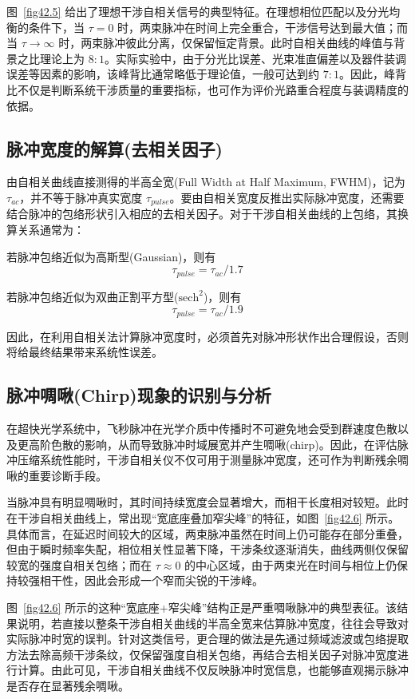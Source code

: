 图~\ref{fig42.5} 给出了理想干涉自相关信号的典型特征。在理想相位匹配以及分光均衡的条件下，当 $\tau=0$ 时，两束脉冲在时间上完全重合，干涉信号达到最大值；而当 $\tau \rightarrow \infty$ 时，两束脉冲彼此分离，仅保留恒定背景。此时自相关曲线的峰值与背景之比理论上为 $8:1$。实际实验中，由于分光比误差、光束准直偏差以及器件装调误差等因素的影响，该峰背比通常略低于理论值，一般可达到约 $7:1$。因此，峰背比不仅是判断系统干涉质量的重要指标，也可作为评价光路重合程度与装调精度的依据。

\subsection{脉冲宽度的解算(去相关因子)}\label{6.1.2}

由自相关曲线直接测得的半高全宽(Full Width at Half Maximum, FWHM)，记为 $\tau_{ac}$，并不等于脉冲真实宽度 $\tau_{pulse}$。要由自相关宽度反推出实际脉冲宽度，还需要结合脉冲的包络形状引入相应的去相关因子。对于干涉自相关曲线的上包络，其换算关系通常为：

若脉冲包络近似为高斯型(Gaussian)，则有
\[
\tau_{pulse}=\tau_{ac}/1.7
\]

若脉冲包络近似为双曲正割平方型($\mathrm{sech}^2$)，则有
\[
\tau_{pulse}=\tau_{ac}/1.9
\]

因此，在利用自相关法计算脉冲宽度时，必须首先对脉冲形状作出合理假设，否则将给最终结果带来系统性误差。

\subsection{脉冲啁啾(Chirp)现象的识别与分析}\label{6.1.3}

在超快光学系统中，飞秒脉冲在光学介质中传播时不可避免地会受到群速度色散以及更高阶色散的影响，从而导致脉冲时域展宽并产生啁啾(chirp)。因此，在评估脉冲压缩系统性能时，干涉自相关仪不仅可用于测量脉冲宽度，还可作为判断残余啁啾的重要诊断手段。

当脉冲具有明显啁啾时，其时间持续宽度会显著增大，而相干长度相对较短。此时在干涉自相关曲线上，常出现``宽底座叠加窄尖峰''的特征，如图~\ref{fig42.6} 所示。具体而言，在延迟时间较大的区域，两束脉冲虽然在时间上仍可能存在部分重叠，但由于瞬时频率失配，相位相关性显著下降，干涉条纹逐渐消失，曲线两侧仅保留较宽的强度自相关包络；而在 $\tau \approx 0$ 的中心区域，由于两束光在时间与相位上仍保持较强相干性，因此会形成一个窄而尖锐的干涉峰。

图~\ref{fig42.6} 所示的这种``宽底座+窄尖峰''结构正是严重啁啾脉冲的典型表征。该结果说明，若直接以整条干涉自相关曲线的半高全宽来估算脉冲宽度，往往会导致对实际脉冲时宽的误判。针对这类信号，更合理的做法是先通过频域滤波或包络提取方法去除高频干涉条纹，仅保留强度自相关包络，再结合去相关因子对脉冲宽度进行计算。由此可见，干涉自相关曲线不仅反映脉冲时宽信息，也能够直观揭示脉冲是否存在显著残余啁啾。

